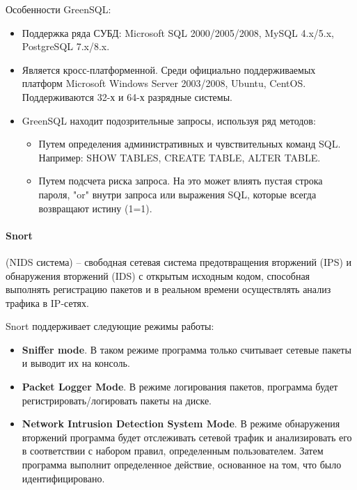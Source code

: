 Особенности GreenSQL:
\begin{itemize}
	\item Поддержка ряда СУБД: Microsoft SQL 2000/2005/2008, MySQL 4.x/5.x, PostgreSQL 7.x/8.x.

	\item Является кросс-платформенной. Среди официально поддерживаемых платформ Microsoft
	Windows Server 2003/2008, Ubuntu, CentOS. Поддерживаются 32-х и 64-х разрядные системы.

	\item GreenSQL находит подозрительные запросы, используя ряд методов:
	\begin{itemize}
		\item Путем определения административных и чувствительных команд SQL.
		Например: SHOW TABLES, CREATE TABLE, ALTER TABLE.

		\item Путем подсчета риска запроса. На это может влиять пустая строка пароля, "or"
		внутри запроса или выражения SQL, которые всегда возвращают истину (1=1).
	\end{itemize}

\end{itemize}


\paragraph*{Snort} (NIDS система) -- свободная сетевая система предотвращения вторжений (IPS)
и обнаружения вторжений (IDS) с открытым исходным кодом, способная выполнять регистрацию
пакетов и в реальном времени осуществлять анализ трафика в IP-сетях.

Snort поддерживает следующие режимы работы:
\begin{itemize}
	\item \textbf{Sniffer mode}. В таком режиме программа только считывает сетевые пакеты и
	выводит их на консоль.

	\item \textbf{Packet Logger Mode}. В режиме логирования пакетов, программа будет
	регистрировать/логировать пакеты на диске.

	\item \textbf{Network Intrusion Detection System Mode}. В режиме обнаружения вторжений
	программа будет отслеживать сетевой трафик и анализировать его в соответствии с набором
	правил, определенным пользователем. Затем программа выполнит определенное действие,
	основанное на том, что было идентифицировано.
\end{itemize}

